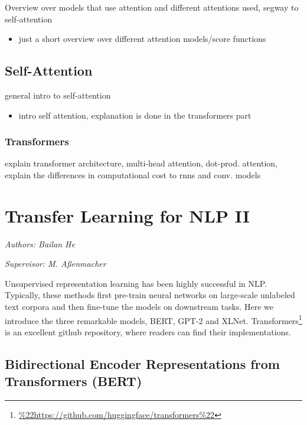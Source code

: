 \documentclass[]{krantz}
\providecommand{\tightlist}{%
  \setlength{\itemsep}{0pt}\setlength{\parskip}{0pt}}
\renewcommand{\href}[2]{#2\footnote{\url{#1}}}
\begin{document}
Overview over models that use attention and different attentions used, segway to self-attention

\begin{itemize}
\tightlist
\item
  just a short overview over different attention models/score functions
\end{itemize}

\hypertarget{self-attention}{%
\section{Self-Attention}\label{self-attention}}

general intro to self-attention

\begin{itemize}
\tightlist
\item
  intro self attention, explanation is done in the transformers part
\end{itemize}

\hypertarget{transformers}{%
\subsection{Transformers}\label{transformers}}

explain transformer architecture, multi-head attention, dot-prod. attention, explain the differences in computational cost to rnns and conv. models

\hypertarget{transfer-learning-for-nlp-ii}{%
\chapter{Transfer Learning for NLP II}\label{transfer-learning-for-nlp-ii}}

\emph{Authors: Bailan He}

\emph{Supervisor: M. Aßenmacher}

Unsupervised representation learning has been highly successful in NLP. Typically, these methods first pre-train neural networks on large-scale unlabeled text corpora and then fine-tune the models on downstream tasks. Here we introduce the three remarkable models, BERT, GPT-2 and XLNet. \href{\%22https://github.com/huggingface/transformers\%22}{Transformers} is an excellent github repository, where readers can find their implementations.

\hypertarget{bidirectional-encoder-representations-from-transformers-bert}{%
\section{Bidirectional Encoder Representations from Transformers (BERT)}\label{bidirectional-encoder-representations-from-transformers-bert}}
\end{document}
